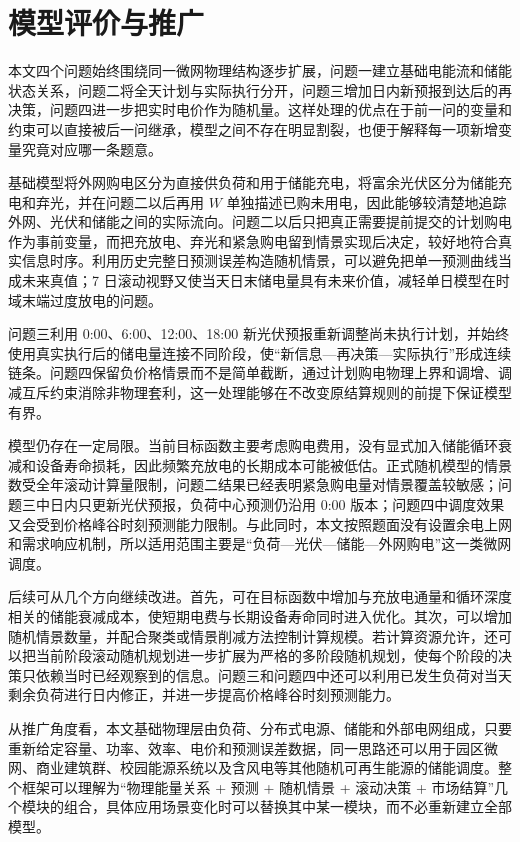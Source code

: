 \section{模型评价与推广}
本文四个问题始终围绕同一微网物理结构逐步扩展，问题一建立基础电能流和储能状态关系，问题二将全天计划与实际执行分开，问题三增加日内新预报到达后的再决策，问题四进一步把实时电价作为随机量。这样处理的优点在于前一问的变量和约束可以直接被后一问继承，模型之间不存在明显割裂，也便于解释每一项新增变量究竟对应哪一条题意。

基础模型将外网购电区分为直接供负荷和用于储能充电，将富余光伏区分为储能充电和弃光，并在问题二以后再用 \(W\) 单独描述已购未用电，因此能够较清楚地追踪外网、光伏和储能之间的实际流向。问题二以后只把真正需要提前提交的计划购电作为事前变量，而把充放电、弃光和紧急购电留到情景实现后决定，较好地符合真实信息时序。利用历史完整日预测误差构造随机情景，可以避免把单一预测曲线当成未来真值；7 日滚动视野又使当天日末储电量具有未来价值，减轻单日模型在时域末端过度放电的问题。

问题三利用 0:00、6:00、12:00、18:00 新光伏预报重新调整尚未执行计划，并始终使用真实执行后的储电量连接不同阶段，使“新信息—再决策—实际执行”形成连续链条。问题四保留负价格情景而不是简单截断，通过计划购电物理上界和调增、调减互斥约束消除非物理套利，这一处理能够在不改变原结算规则的前提下保证模型有界。

模型仍存在一定局限。当前目标函数主要考虑购电费用，没有显式加入储能循环衰减和设备寿命损耗，因此频繁充放电的长期成本可能被低估。正式随机模型的情景数受全年滚动计算量限制，问题二结果已经表明紧急购电量对情景覆盖较敏感；问题三中日内只更新光伏预报，负荷中心预测仍沿用 0:00 版本；问题四中调度效果又会受到价格峰谷时刻预测能力限制。与此同时，本文按照题面没有设置余电上网和需求响应机制，所以适用范围主要是“负荷—光伏—储能—外网购电”这一类微网调度。

后续可从几个方向继续改进。首先，可在目标函数中增加与充放电通量和循环深度相关的储能衰减成本，使短期电费与长期设备寿命同时进入优化。其次，可以增加随机情景数量，并配合聚类或情景削减方法控制计算规模。若计算资源允许，还可以把当前阶段滚动随机规划进一步扩展为严格的多阶段随机规划，使每个阶段的决策只依赖当时已经观察到的信息。问题三和问题四中还可以利用已发生负荷对当天剩余负荷进行日内修正，并进一步提高价格峰谷时刻预测能力。

从推广角度看，本文基础物理层由负荷、分布式电源、储能和外部电网组成，只要重新给定容量、功率、效率、电价和预测误差数据，同一思路还可以用于园区微网、商业建筑群、校园能源系统以及含风电等其他随机可再生能源的储能调度。整个框架可以理解为“物理能量关系 + 预测 + 随机情景 + 滚动决策 + 市场结算”几个模块的组合，具体应用场景变化时可以替换其中某一模块，而不必重新建立全部模型。
